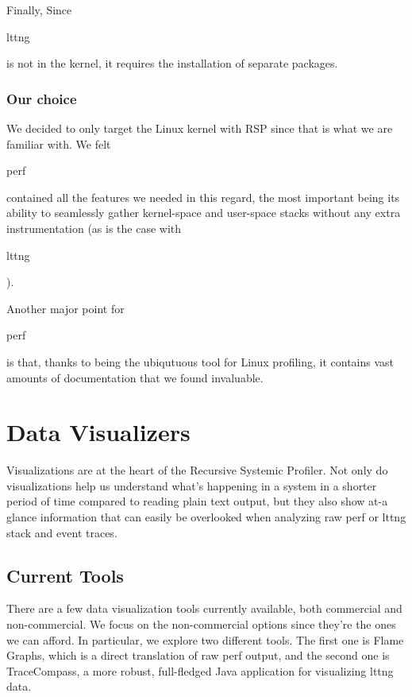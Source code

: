 \documentclass[10pt]{article}
\begin{document}
Finally, Since \begin{tt}lttng\end{tt} is not in the kernel, it requires the
installation of separate packages.

\subsubsection{Our choice}

We decided to only target the Linux kernel with RSP since that is what we are
familiar with. We felt \begin{tt}perf\end{tt} contained all the features we
needed in this regard, the most important being its ability to
seamlessly gather kernel-space and user-space stacks without any extra
instrumentation (as is the case with \begin{tt}lttng\end{tt}).

Another major point for \begin{tt}perf\end{tt} is that, thanks to being the
ubiqutuous tool for Linux profiling, it contains vast amounts of
documentation that we found invaluable.

\section{Data Visualizers}

Visualizations are at the heart of the Recursive Systemic Profiler. Not only do
visualizations help us understand what's happening in a system in a shorter
period of time compared to reading plain text output, but they also show at-a
glance information that can easily be overlooked when analyzing raw perf or lttng
stack and event traces.

\subsection{Current Tools}

There are a few data visualization tools currently available, both commercial and
non-commercial. We focus on the non-commercial options since they're the ones we
can afford. In particular, we explore two different tools. The first one is Flame
Graphs, which is a direct translation of raw perf output, and the
second one is TraceCompass, a more robust, full-fledged Java application for
visualizing lttng data.
\end{document}
